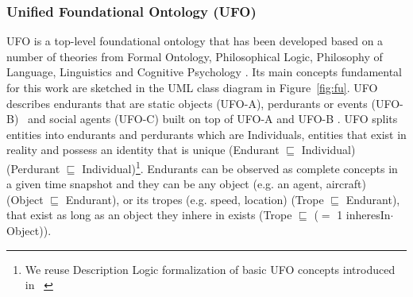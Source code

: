 \documentclass[sw]{iosart2x}
\newcommand{\term}[1]{\textnormal{\textsf{#1}}}
\begin{document}
\subsubsection{Unified Foundational Ontology (UFO)}
\label{sec:back:onto:ufo}


UFO is a top-level foundational ontology that has been developed based on a number of theories from Formal Ontology, Philosophical Logic, Philosophy of Language, Linguistics and Cognitive Psychology \cite{Guizzardi2005c}. Its main concepts fundamental for this work are sketched in the UML class diagram
in Figure~\ref{fig:fu}. UFO describes endurants that are static objects (UFO-A)\cite{Guizzardi2005b}, perdurants or events (UFO-B)~\cite{Guizzardi2013} and social agents (UFO-C) built on top of UFO-A and UFO-B \cite{Guizzardi2010a}. UFO splits entities into endurants and perdurants which are Individuals, entities that exist in reality and possess an
identity that is unique (\term{Endurant} $ \sqsubseteq $ \term{Individual}) (\term{Perdurant} $ \sqsubseteq $ \term{Individual})\footnote{We reuse Description Logic formalization of basic UFO concepts introduced in ~\cite{DBLP:conf/jowo/BenevidesBGP17}}. Endurants can be observed as complete concepts in a given time snapshot and they can be any object (e.g. an agent, aircraft)  (\term{Object} $ \sqsubseteq $  \term{Endurant}), or its tropes (e.g. speed, location) (\term{Trope} $ \sqsubseteq $  \term{Endurant}), that exist as long as an object they inhere in exists (\term{Trope} $ \sqsubseteq $  ($ = $ 1 \term{inheresIn}$\cdot$\term{Object})). 
\end{document}
